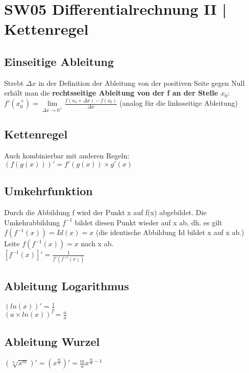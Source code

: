 \documentclass[../main.tex]{subfiles}
\begin{document}

\chapter{SW05 Differentialrechnung II | Kettenregel}
\section{Einseitige Ableitung}
Strebt $\Delta x$ in der Definition der Ableitung von der positiven Seite gegen Null erhält man die \textbf{rechtsseitige Ableitung von der f an der Stelle $x_0$}: \\ [7pt]
$f'(x_0^+) = \lim\limits_{\Delta x \to 0^+} \frac{f(x_0 + \Delta x) - f(x_0)}{\Delta x}$ (analog für die linksseitige Ableitung)

\section{Kettenregel}
Auch kombinierbar mit anderen Regeln: \\ [7pt]
$(f(g(x)))' = f'(g(x)) \times g'(x)$

\section{Umkehrfunktion}
Durch die Abbildung f wird der Punkt x auf f(x) abgebildet. Die Umkehrabbildung $f^{-1}$ bildet diesen Punkt wieder auf x ab, dh. es gilt $f(f^{-1}(x)) = Id(x) = x$ (die identische Abbildung Id bildet x auf x ab.) \\ [7pt]
Leite $f(f^{-1}(x)) = x$ nach x ab. \\ [7pt]
$[f^{-1}(x)]' = \frac{1}{f'(f^{-1}(x))}$

\section{Ableitung Logarithmus}
$(ln(x))' = \frac{1}{x}$ \\ [7pt]
$(a \times ln(x))' = \frac{a}{x}$

\section{Ableitung Wurzel}
$(\sqrt[n]{x^m})' = (x^{\frac{m}{n}})' = \frac{m}{n}x^{\frac{m}{n}-1}$
\end{document}
